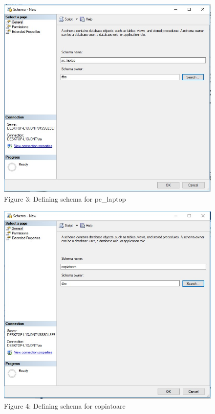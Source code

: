 \begin{figure}[H]
	\centering
	\includegraphics[scale=0.5]{screens/4.jpg}
	\caption*{Figure 3: Defining schema for pc\_laptop}
	\label{}
\end{figure}

\begin{figure}[H]
	\centering
	\includegraphics[scale=0.5]{screens/5.jpg}
	\caption*{Figure 4: Defining schema for copiatoare}
	\label{}
\end{figure}

